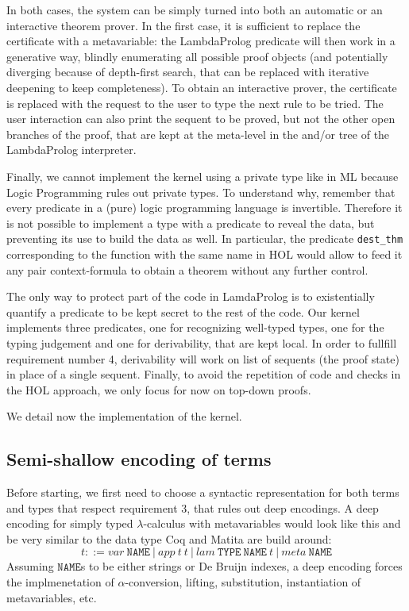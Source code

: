 \documentclass[preprint]{sigplanconf}
\begin{document}
In both cases, the system can be simply turned into both an automatic or an interactive theorem prover. In the first case, it is sufficient to replace the certificate with a metavariable: the LambdaProlog predicate will then work in a generative way, blindly enumerating all possible proof objects (and potentially diverging because of depth-first search, that can be replaced with iterative deepening to keep completeness). To obtain an interactive prover, the certificate is replaced with the request to the user to type the next rule to be tried. The user interaction can also print the sequent to be proved, but not the other open branches of the proof, that are kept at the meta-level in the and/or tree of the LambdaProlog interpreter.

Finally, we cannot implement the kernel using a private type like in ML because Logic Programming rules out private types. To understand why, remember that every predicate in a (pure) logic programming language is invertible. Therefore it is not possible to implement a type with a predicate to reveal the data, but preventing its use to build the data as well. In particular, the predicate \verb+dest_thm+ corresponding to the function with the same name in HOL would allow to feed it any pair context-formula to obtain a theorem without any further control.

The only way to protect part of the code in LamdaProlog is to existentially quantify a predicate to be kept secret to the rest of the code. Our kernel implements three predicates, one for recognizing well-typed types, one for the typing judgement and one for derivability, that are kept local. In order to fullfill requirement number 4, derivability will work on list of sequents (the proof state) in place of a single sequent. Finally, to avoid the repetition of code and checks in the HOL approach, we only focus for now on top-down proofs.

We detail now the implementation of the kernel.

\subsection{Semi-shallow encoding of terms}\label{methodology}
Before starting, we first need to choose a syntactic representation for both
terms and types that respect requirement 3, that rules out deep encodings.
A deep encoding for simply typed $\lambda$-calculus with metavariables would
look like this and be very similar to the data type Coq and Matita are build around:
$$ t ::= var~\mathtt{NAME} ~|~ app~t~t ~|~ lam~\mathtt{TYPE}~\mathtt{NAME}~t ~|~ meta~\mathtt{NAME}$$
Assuming $\mathtt{NAME}$s to be either strings or De Bruijn indexes, a deep encoding forces the implmenetation of $\alpha$-conversion, lifting, substitution, instantiation of metavariables, etc.
\end{document}
